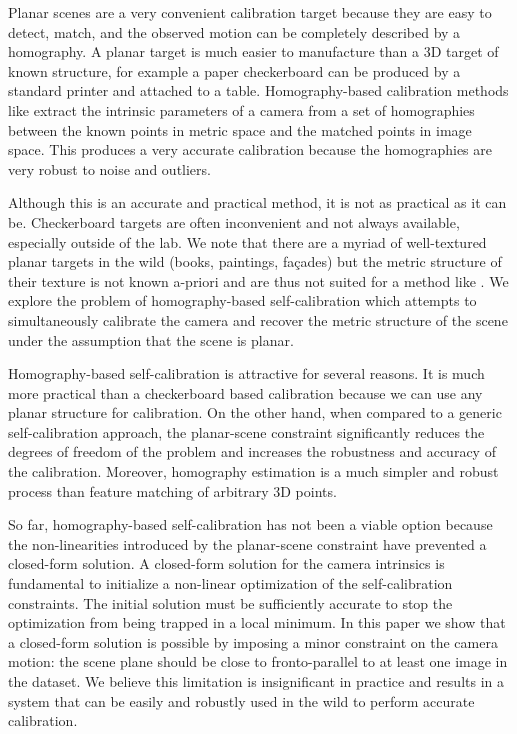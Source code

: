 \documentclass[10pt,twocolumn,letterpaper]{article}
\begin{document}
Planar scenes are a very convenient calibration target because they are easy to detect, match, and the observed motion can be completely described by a homography. A planar target is much easier to manufacture than a 3D target of known structure, for example a paper checkerboard can be produced by a standard printer and attached to a table. Homography-based calibration methods like \cite{zhang1999} extract the intrinsic parameters of a camera from a set of homographies between the known points in metric space and the matched points in image space. This produces a very accurate calibration because the homographies are very robust to noise and outliers.

Although this is an accurate and practical method, it is not as practical as it can be. Checkerboard targets are often inconvenient and not always available, especially outside of the lab. We note that there are a myriad of well-textured planar targets in the wild (books, paintings, fa\c{c}ades) but the metric structure of their texture is not known a-priori and are thus not suited for a method like \cite{zhang1999}. We explore the problem of homography-based self-calibration which attempts to simultaneously calibrate the camera and recover the metric structure of the scene under the assumption that the scene is planar.

Homography-based self-calibration is attractive for several reasons. It is much more practical than a checkerboard based calibration because we can use any planar structure for calibration. On the other hand, when compared to a generic self-calibration approach, the planar-scene constraint significantly reduces the degrees of freedom of the problem and increases the robustness and accuracy of the calibration. Moreover, homography estimation is a much simpler and robust process than feature matching of arbitrary 3D points.

So far, homography-based self-calibration has not been a viable option because the non-linearities introduced by the planar-scene constraint have prevented a closed-form solution. A closed-form solution for the camera intrinsics is fundamental to initialize a non-linear optimization of the self-calibration constraints. The initial solution must be sufficiently accurate to stop the optimization from being trapped in a local minimum. In this paper we show that a closed-form solution is possible by imposing a minor constraint on the camera motion: the scene plane should be close to fronto-parallel to at least one image in the dataset. We believe this limitation is insignificant in practice and results in a system that can be easily and robustly used in the wild to perform accurate calibration.
\end{document}
